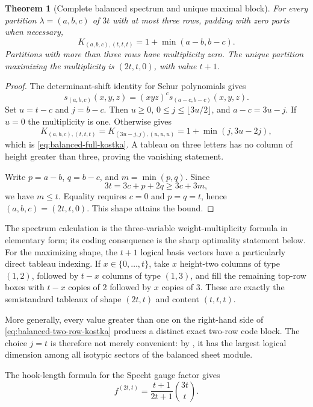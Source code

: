 \documentclass[11pt]{article}
\newtheorem{theorem}{Theorem}[section]
\theoremstyle{definition}
\theoremstyle{remark}
\begin{document}
\begin{theorem}[Complete balanced spectrum and unique maximal block]\label{thm:balanced-full-spectrum}
For every partition $\lambda=(a,b,c)$ of $3t$ with at most three rows, padding with zero parts when necessary,
\begin{equation}\label{eq:balanced-full-kostka}
 K_{(a,b,c),(t,t,t)}=1+\min(a-b,b-c).
\end{equation}
Partitions with more than three rows have multiplicity zero.  The unique partition maximizing the multiplicity is $(2t,t,0)$, with value $t+1$.
\end{theorem}

\begin{proof}
The determinant-shift identity for Schur polynomials gives
\[
 s_{(a,b,c)}(x,y,z)=(xyz)^c s_{(a-c,b-c)}(x,y,z).
\]
Set $u=t-c$ and $j=b-c$.  Then $u\geq0$, $0\leq j\leq\lfloor3u/2\rfloor$, and $a-c=3u-j$.  If $u=0$ the multiplicity is one.  Otherwise  gives
\[
 K_{(a,b,c),(t,t,t)}
 =K_{(3u-j,j),(u,u,u)}
 =1+\min(j,3u-2j),
\]
which is \eqref{eq:balanced-full-kostka}.  A tableau on three letters has no column of height greater than three, proving the vanishing statement.

Write $p=a-b$, $q=b-c$, and $m=\min(p,q)$.  Since
\[
 3t=3c+p+2q\geq3c+3m,
\]
we have $m\leq t$.  Equality requires $c=0$ and $p=q=t$, hence $(a,b,c)=(2t,t,0)$.  This shape attains the bound.
\end{proof}

The spectrum calculation is the three-variable weight-multiplicity formula in elementary form; its coding consequence is the sharp optimality statement below.  For the maximizing shape, the $t+1$ logical basis vectors have a particularly direct tableau indexing.  If $x\in\{0,\ldots,t\}$, take $x$ height-two columns of type $(1,2)$, followed by $t-x$ columns of type $(1,3)$, and fill the remaining top-row boxes with $t-x$ copies of $2$ followed by $x$ copies of $3$.  These are exactly the semistandard tableaux of shape $(2t,t)$ and content $(t,t,t)$.

More generally, every value greater than one on the right-hand side of \eqref{eq:balanced-two-row-kostka} produces a distinct exact two-row code block.  The choice $j=t$ is therefore not merely convenient: by , it has the largest logical dimension among all isotypic sectors of the balanced sheet module.

The hook-length formula for the Specht gauge factor gives
\begin{equation}\label{eq:balanced-specht-dim}
 f^{(2t,t)}
 =\frac{t+1}{2t+1}\binom{3t}{t}.
\end{equation}
\end{document}
